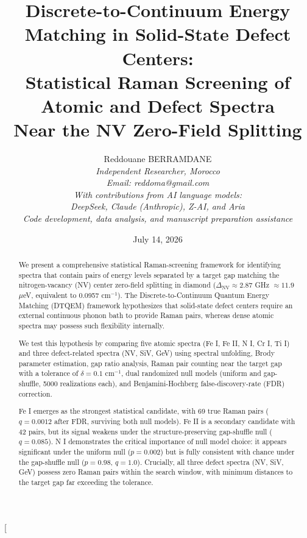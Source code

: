 \documentclass[11pt,a4paper]{article}
\begin{document}
\title{\textbf{Discrete-to-Continuum Energy Matching in Solid-State Defect Centers:}\\
\large{Statistical Raman Screening of Atomic and Defect Spectra\\
Near the NV Zero-Field Splitting}}
\author{Reddouane BERRAMDANE\\
\textit{Independent Researcher, Morocco}\\
\textit{Email: reddoma@gmail.com}\\[0.5cm]
\textit{With contributions from AI language models:}\\
\textit{DeepSeek, Claude (Anthropic), Z-AI, and Aria}\\
\textit{Code development, data analysis, and manuscript preparation assistance}}
\date{July 14, 2026}
\twocolumn[
\begin{@twocolumnfalse}
\maketitle
\begin{abstract}
We present a comprehensive statistical Raman-screening framework for identifying spectra that contain pairs of energy levels separated by a target gap matching the nitrogen-vacancy (NV) center zero-field splitting in diamond ($\Delta_{\mathrm{NV}} \approx 2.87$ GHz $\approx 11.9$ $\mu$eV, equivalent to 0.0957 cm$^{-1}$). The Discrete-to-Continuum Quantum Energy Matching (DTQEM) framework hypothesizes that solid-state defect centers require an external continuous phonon bath to provide Raman pairs, whereas dense atomic spectra may possess such flexibility internally.

We test this hypothesis by comparing five atomic spectra (Fe I, Fe II, N I, Cr I, Ti I) and three defect-related spectra (NV, SiV, GeV) using spectral unfolding, Brody parameter estimation, gap ratio analysis, Raman pair counting near the target gap with a tolerance of $\delta = 0.1$ cm$^{-1}$, dual randomized null models (uniform and gap-shuffle, 5000 realizations each), and Benjamini-Hochberg false-discovery-rate (FDR) correction.

Fe I emerges as the strongest statistical candidate, with 69 true Raman pairs ($q = 0.0012$ after FDR, surviving both null models). Fe II is a secondary candidate with 42 pairs, but its signal weakens under the structure-preserving gap-shuffle null ($q = 0.085$). N I demonstrates the critical importance of null model choice: it appears significant under the uniform null ($p = 0.002$) but is fully consistent with chance under the gap-shuffle null ($p = 0.98$, $q = 1.0$). Crucially, all three defect spectra (NV, SiV, GeV) possess zero Raman pairs within the search window, with minimum distances to the target gap far exceeding the tolerance.


\end{abstract}
\end{@twocolumnfalse}
\end{document}
